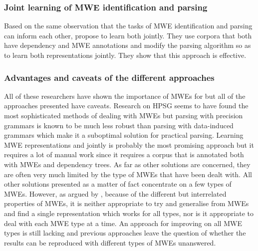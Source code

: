 \documentclass[output=paper]{langsci/langscibook}
\begin{document}
                        \subsubsection{Joint learning of MWE identification and parsing}
                        \indent Based on the same observation that the tasks of MWE identification and parsing can inform each other, \citet{constantnivre16} propose to learn both jointly. They use corpora that both have dependency and MWE annotations and modify the parsing algorithm so as to learn both representations jointly. They show that this approach is effective. 

                        \subsubsection{Advantages and caveats of the different approaches}
                        \indent All of these researchers have shown the importance of MWEs for  but all of the approaches presented have caveats. Research on HPSG seems to have found the most sophisticated methods of dealing with MWEs but parsing with precision grammars is known to be much less robust \citep{zhang08robustparsing} than parsing with data-induced grammars which make it a suboptimal solution for practical parsing. Learning MWE representations and  jointly is probably the most promising approach but it requires a lot of manual work since it requires a corpus that is annotated both with MWEs and dependency trees. As far as other solutions are concerned, they are often very much limited by the type of MWEs that have been dealt with. All other solutions presented as a matter of fact concentrate on a few types of MWEs. However, as argued by \citet{kim2008}, because of the different but interrelated properties of MWEs, it is neither appropriate to try and generalise from MWEs and find a single representation which works for all types, nor is it appropriate to deal with each MWE type at a time. An approach for improving  on all MWE types is still lacking and previous approaches leave the question of whether the results can be reproduced with different types of MWEs unanswered. 
\end{document}
